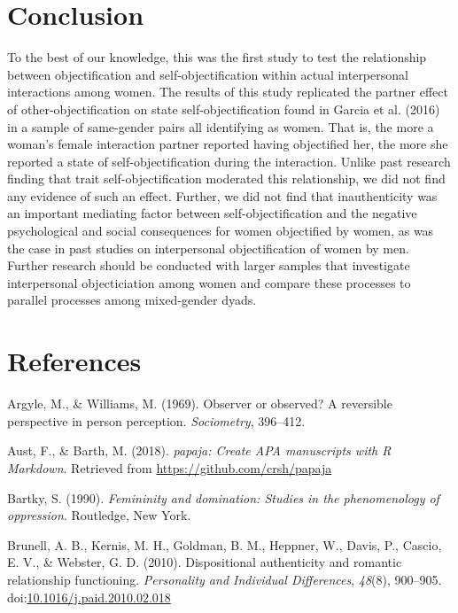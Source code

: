 \documentclass[man]{apa6}
\begin{document}
\section{Conclusion}\label{conclusion}

To the best of our knowledge, this was the first study to test the
relationship between objectification and self-objectification within
actual interpersonal interactions among women. The results of this study
replicated the partner effect of other-objectification on state
self-objectification found in Garcia et al. (2016) in a sample of
same-gender pairs all identifying as women. That is, the more a woman's
female interaction partner reported having objectified her, the more she
reported a state of self-objectification during the interaction. Unlike
past research finding that trait self-objectification moderated this
relationship, we did not find any evidence of such an effect. Further,
we did not find that inauthenticity was an important mediating factor
between self-objectification and the negative psychological and social
consequences for women objectified by women, as was the case in past
studies on interpersonal objectification of women by men. Further
research should be conducted with larger samples that investigate
interpersonal objecticiation among women and compare these processes to
parallel processes among mixed-gender dyads.

\newpage

\section{References}\label{references}

\begingroup
\setlength{\parindent}{-0.5in} \setlength{\leftskip}{0.5in}

\hypertarget{refs}{}
\hypertarget{ref-argyle1969}{}
Argyle, M., \& Williams, M. (1969). Observer or observed? A reversible
perspective in person perception. \emph{Sociometry}, 396--412.

\hypertarget{ref-R-papaja}{}
Aust, F., \& Barth, M. (2018). \emph{papaja: Create APA manuscripts with
R Markdown}. Retrieved from \url{https://github.com/crsh/papaja}

\hypertarget{ref-Bartky}{}
Bartky, S. (1990). \emph{Femininity and domination: Studies in the
phenomenology of oppression}. Routledge, New York.

\hypertarget{ref-brunelletal2010}{}
Brunell, A. B., Kernis, M. H., Goldman, B. M., Heppner, W., Davis, P.,
Cascio, E. V., \& Webster, G. D. (2010). Dispositional authenticity and
romantic relationship functioning. \emph{Personality and Individual
Differences}, \emph{48}(8), 900--905.
doi:\href{https://doi.org/10.1016/j.paid.2010.02.018}{10.1016/j.paid.2010.02.018}
\end{document}
